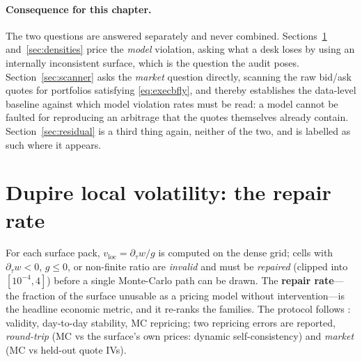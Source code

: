 \paragraph{Consequence for this chapter.} The two questions are answered separately and never
combined. Sections~\ref{sec:localvol} and~\ref{sec:densities} price the \emph{model} violation,
asking what a desk loses by using an internally inconsistent surface, which is the question the
audit poses. Section~\ref{sec:scanner} asks the \emph{market} question directly, scanning the
raw bid/ask quotes for portfolios satisfying \eqref{eq:execbfly}, and thereby establishes the
data-level baseline against which model violation rates must be read: a model cannot be faulted
for reproducing an arbitrage that the quotes themselves already contain. Section~\ref{sec:residual}
is a third thing again, neither of the two, and is labelled as such where it appears.

\section{Dupire local volatility: the repair rate}\label{sec:localvol}

For each surface pack, $v_{\mathrm{loc}}=\partial_\tau w/g$ is computed on the dense grid;
cells with $\partial_\tau w<0$, $g\le0$, or non-finite ratio are \emph{invalid} and must be
\emph{repaired} (clipped into $[10^{-4},4]$) before a single Monte-Carlo path can be drawn.
The \textbf{repair rate}---the fraction of the surface unusable as a pricing model without
intervention---is the headline economic metric, and it re-ranks the families. The protocol
follows \cite[\S7]{chataigner2020}: validity, day-to-day stability, MC repricing; two
repricing errors are reported, \emph{round-trip} (MC vs the surface's own prices: dynamic
self-consistency) and \emph{market} (MC vs held-out quote IVs).

